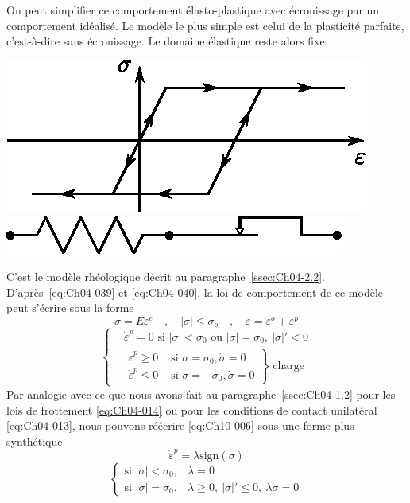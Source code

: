 On peut simplifier ce comportement élasto-plastique avec écrouissage par un 	comportement idéalisé.
Le modèle le plus simple est celui de la plasticité parfaite, c'est-à-dire sans écrouissage.
Le domaine élastique reste alors fixe
\begin{center}
    \includegraphics{../images/T1_Ch10-03.eps}
    \includegraphics{../images/T1_Ch10-04.eps}
\end{center}
C'est le modèle rhéologique décrit au paragraphe~\ref{ssec:Ch04-2.2}.
D'après~\eqref{eq:Ch04-039} et \eqref{eq:Ch04-040}, la loi de comportement de ce modèle peut s'écrire sous la forme 
\begin{equation}
    \sigma = E \varepsilon^e \quad, \quad |\sigma| \leq \sigma_o \quad, \quad \varepsilon = \varepsilon^o + \varepsilon^p 
    \label{eq:Ch10-005}
\end{equation}
\begin{equation}
    \left\{
    \begin{aligned}
        &\dot{\varepsilon}^p = 0  \text{ si } |\sigma| < \sigma_0 \text{ ou } |\sigma| = \sigma_0, \ |\sigma|' < 0 \\
        &\left.
        \begin{aligned}
            \dot{\varepsilon}^p \geq 0 & \text{ si } \sigma = \sigma_0, \dot{\sigma} = 0 \\
            \dot{\varepsilon}^p \leq 0 & \text{ si } \sigma = - \sigma_0, \dot{\sigma} = 0
        \end{aligned}
        \right\} \text{ charge}
    \end{aligned}
    \right.
    \label{eq:Ch10-006}
\end{equation}
Par analogie avec ce que nous avons fait au paragraphe~\ref{ssec:Ch04-1.2} pour les lois de frottement \eqref{eq:Ch04-014} ou pour les conditions de contact unilatéral \eqref{eq:Ch04-013}, nous pouvons réécrire \eqref{eq:Ch10-006} sous une forme plus synthétique 
\begin{equation}
    \dot{\varepsilon}^p = \lambda \text{sign} (\sigma)
    \label{eq:Ch10-007}
\end{equation}
\begin{equation}
    \left\{
    \begin{aligned}
        \text{si } |\sigma| < \sigma_0, & \lambda = 0 \\
        \text{si } |\sigma| = \sigma_0, & \lambda \geq 0, \ |\sigma|' \leq 0, \ \lambda \dot{\sigma} = 0
    \end{aligned}
    \right.
    \label{eq:Ch10-008}
\end{equation}


